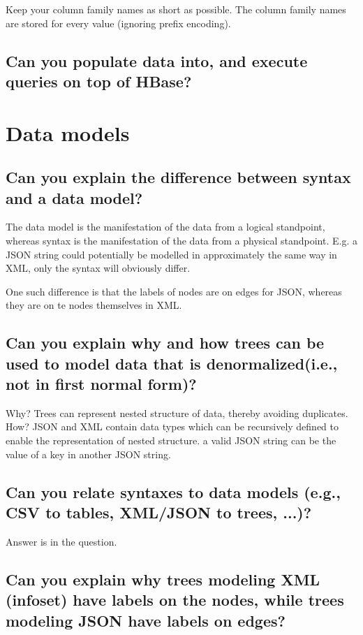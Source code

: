 \documentclass{article}
\begin{document}
Keep your column family names as short as possible. The column family names are stored for every value (ignoring prefix encoding). 

\subsection{Can you populate data into, and execute queries on top of HBase?}

\pagebreak

\section{Data models}
\subsection{Can you explain the difference between syntax and a data model?}

The data model is the manifestation of the data from a logical standpoint, whereas syntax is the manifestation of the data from a physical standpoint. E.g. a JSON string could potentially be modelled in approximately the same way in XML, only the syntax will obviously differ.

One such difference is that the labels of nodes are on edges for JSON, whereas they are on te nodes themselves in XML.

\subsection{Can you explain why and how trees can be used to model data that is denormalized(i.e., not in first normal form)?}

Why? Trees can represent nested structure of data, thereby avoiding duplicates. How? JSON and XML contain data types which can be recursively defined to enable the representation of nested structure. a valid JSON string can be the value of a key in another JSON string.

\subsection{Can you relate syntaxes to data models (e.g., CSV to tables, XML/JSON to trees, ...)?}

Answer is in the question.

\subsection{Can you explain why trees modeling XML (infoset) have labels on the nodes, while trees modeling JSON have labels on edges?}
\end{document}
